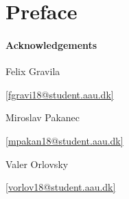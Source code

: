 \chapter*{Preface} \label{sec:forord}
\subsubsection*{Acknowledgements}
\bigskip
\newcommand*\signatureline[2]{\vspace*{2cm}\parbox{5cm}{
    \begin{center}
        \hrulefill\par#1\par#2
    \end{center}
    }
}
\newcommand*\mailto[1]{\href{mailto:#1}{[#1]}}

\begingroup
  \centering
  \signatureline{Felix Gravila}{\mailto{fgravi18@student.aau.dk}}
  \hspace{1cm}
  \signatureline{Miroslav Pakanec}{\mailto{mpakan18@student.aau.dk}}
  \hspace{1cm}
  \signatureline{Valer Orlovsky}{\mailto{vorlov18@student.aau.dk}}
\endgroup

\clearpage
